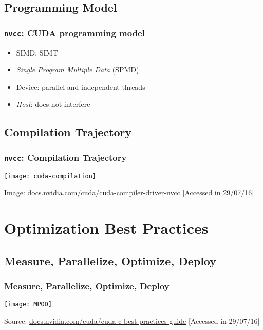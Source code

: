 \documentclass[10pt, compress]{beamer}
\begin{document}
\subsection{Programming Model}

\begin{frame}
    \frametitle{\texttt{nvcc}: CUDA programming model}
    \begin{itemize}
        \item SIMD, SIMT
        \item \textit{Single Program Multiple Data} (SPMD)
            \pause
        \item Device: \alert{parallel} and \alert{independent} threads
        \item \textit{Host}: does not interfere
    \end{itemize}
\end{frame}

\subsection{Compilation Trajectory}

\begin{frame}
    \frametitle{\texttt{nvcc}: Compilation Trajectory}
    \centering
    \texttt{[image: cuda-compilation]}
    \vfill

    \begin{center}
        \tiny{Image: \url{docs.nvidia.com/cuda/cuda-compiler-driver-nvcc} [Accessed in 29/07/16]}
    \end{center}
\end{frame}

\section{Optimization Best Practices}

\subsection{Measure, Parallelize, Optimize, Deploy}

\begin{frame}
    \frametitle{Measure, Parallelize, Optimize, Deploy}
    \centering
    \texttt{[image: MPOD]}
    \vfill

    \begin{center}
        \tiny{Source: \url{docs.nvidia.com/cuda/cuda-c-best-practices-guide} [Accessed in 29/07/16]}
    \end{center}
\end{frame}
\end{document}
